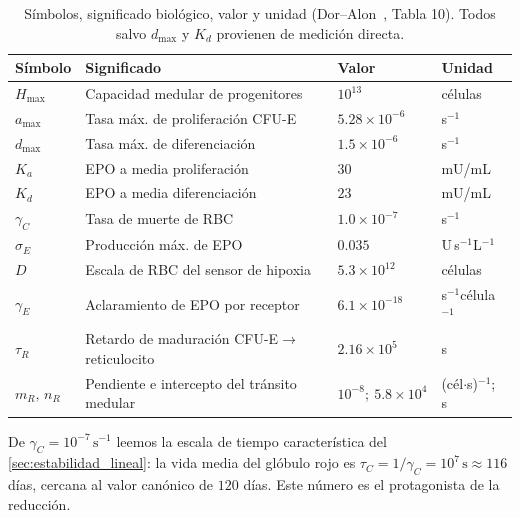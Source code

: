 \begin{table}[htbp]
\centering
\footnotesize
\caption{Símbolos, significado biológico, valor y unidad (Dor--Alon~\cite{dor2026}, Tabla 10). Todos salvo $d_{\max}$ y $K_d$ provienen de medición directa.}
\label{tab:eritro_simbolos}
\begin{tabular}{llll}
\hline
Símbolo & Significado & Valor & Unidad \\
\hline
$H_{\max}$   & Capacidad medular de progenitores       & $10^{13}$              & células \\
$a_{\max}$   & Tasa máx. de proliferación CFU-E        & $5.28\times10^{-6}$   & s$^{-1}$ \\
$d_{\max}$   & Tasa máx. de diferenciación             & $1.5\times10^{-6}$    & s$^{-1}$ \\
$K_a$        & EPO a media proliferación               & $30$                  & mU/mL \\
$K_d$        & EPO a media diferenciación              & $23$                  & mU/mL \\
$\gamma_C$   & Tasa de muerte de RBC                   & $1.0\times10^{-7}$    & s$^{-1}$ \\
$\sigma_E$   & Producción máx. de EPO                  & $0.035$               & U\,s$^{-1}$L$^{-1}$ \\
$D$          & Escala de RBC del sensor de hipoxia     & $5.3\times10^{12}$    & células \\
$\gamma_E$   & Aclaramiento de EPO por receptor        & $6.1\times10^{-18}$   & s$^{-1}$célula$^{-1}$ \\
$\tau_R$     & Retardo de maduración CFU-E$\to$reticulocito & $2.16\times10^{5}$ & s \\
$m_R,\,n_R$  & Pendiente e intercepto del tránsito medular & $10^{-8};\ 5.8\times10^{4}$ & (cél$\cdot$s)$^{-1}$; s \\
\hline
\end{tabular}
\end{table}

De $\gamma_C = 10^{-7}\,\mathrm{s}^{-1}$ leemos la escala de tiempo característica del \cref{sec:estabilidad_lineal}: la vida media del glóbulo rojo es $\tau_C = 1/\gamma_C = 10^{7}\,\mathrm{s}\approx 116$ días, cercana al valor canónico de $120$ días. Este número es el protagonista de la reducción.

